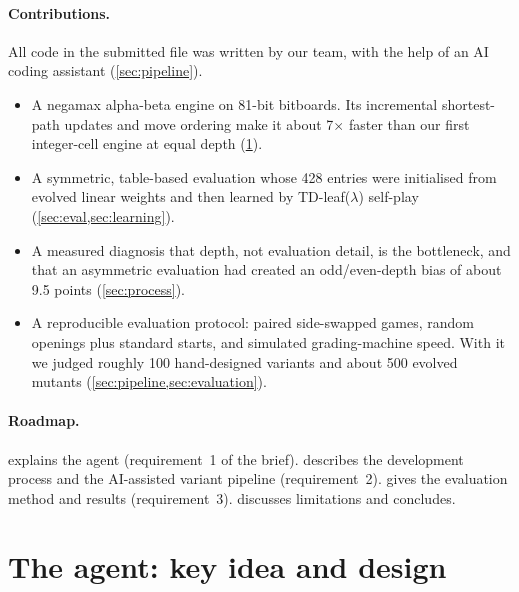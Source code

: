 \paragraph{Contributions.}
All code in the submitted file was written by our team, with the help of an AI coding assistant
(\cref{sec:pipeline}).
\begin{itemize}
  \item A negamax alpha-beta engine on 81-bit bitboards. Its incremental shortest-path updates
        and move ordering make it about 7$\times$ faster than our first integer-cell engine at
        equal depth (\cref{sec:agent}).
  \item A symmetric, table-based evaluation whose 428 entries were initialised from evolved
        linear weights and then learned by TD-leaf($\lambda$) self-play
        (\cref{sec:eval,sec:learning}).
  \item A measured diagnosis that depth, not evaluation detail, is the bottleneck, and that an
        asymmetric evaluation had created an odd/even-depth bias of about 9.5 points
        (\cref{sec:process}).
  \item A reproducible evaluation protocol: paired side-swapped games, random openings plus
        standard starts, and simulated grading-machine speed. With it we judged roughly 100
        hand-designed variants and about 500 evolved mutants (\cref{sec:pipeline,sec:evaluation}).
\end{itemize}

\paragraph{Roadmap.}
 explains the agent (requirement~1 of the brief).
 describes the development process and the AI-assisted variant pipeline
(requirement~2).  gives the evaluation method and results (requirement~3).
 discusses limitations and concludes.

\section{The agent: key idea and design}
\label{sec:agent}

